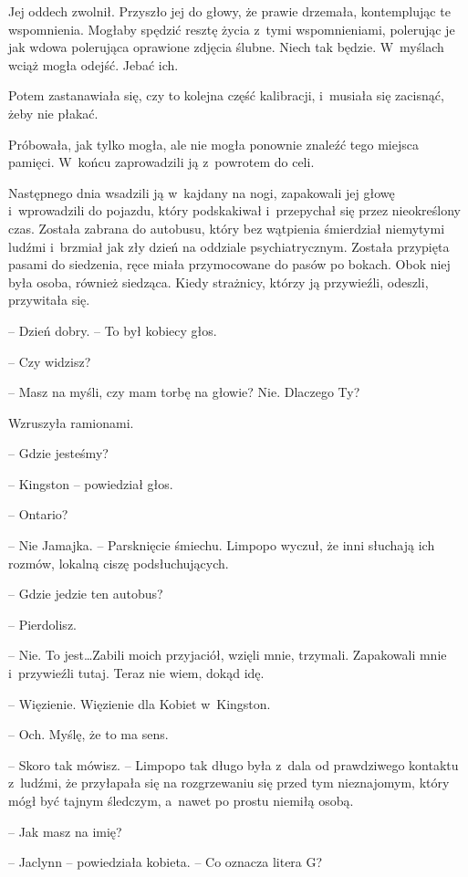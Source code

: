 \documentclass[oneside,polish,11pt,sfheadings]{mwbk}
\begin{document}
Jej oddech zwolnił. Przyszło jej do głowy, że prawie drzemała,
kontemplując te wspomnienia. Mogłaby spędzić resztę życia z~tymi
wspomnieniami, polerując je jak wdowa polerująca oprawione zdjęcia
ślubne. Niech tak będzie. W~myślach wciąż mogła odejść. Jebać ich.

Potem zastanawiała się, czy to kolejna część kalibracji, i~musiała się
zacisnąć, żeby nie płakać.

Próbowała, jak tylko mogła, ale nie mogła ponownie znaleźć tego miejsca
pamięci. W~końcu zaprowadzili ją z~powrotem do celi.

Następnego dnia wsadzili ją w~kajdany na nogi, zapakowali jej głowę i~wprowadzili do pojazdu, który podskakiwał i~przepychał się przez
nieokreślony czas. Została zabrana do autobusu, który bez wątpienia
śmierdział niemytymi ludźmi i~brzmiał jak zły dzień na oddziale
psychiatrycznym. Została przypięta pasami do siedzenia, ręce miała
przymocowane do pasów po bokach. Obok niej była osoba, również siedząca.
Kiedy strażnicy, którzy ją przywieźli, odeszli, przywitała się.

-- Dzień dobry. -- To był kobiecy głos.

-- Czy widzisz?

-- Masz na myśli, czy mam torbę na głowie? Nie. Dlaczego Ty?

Wzruszyła ramionami.

-- Gdzie jesteśmy?

-- Kingston -- powiedział głos.

-- Ontario?

-- Nie Jamajka. -- Parsknięcie śmiechu. Limpopo wyczuł, że inni słuchają
ich rozmów, lokalną ciszę podsłuchujących.

-- Gdzie jedzie ten autobus?

-- Pierdolisz.

-- Nie. To jest\ldots  Zabili moich przyjaciół, wzięli mnie, trzymali.
Zapakowali mnie i~przywieźli tutaj. Teraz nie wiem, dokąd idę.

-- Więzienie. Więzienie dla Kobiet w~Kingston.

-- Och. Myślę, że to ma sens.

-- Skoro tak mówisz. -- Limpopo tak długo była z~dala od prawdziwego
kontaktu z~ludźmi, że przyłapała się na rozgrzewaniu się przed tym
nieznajomym, który mógł być tajnym śledczym, a~nawet po prostu niemiłą
osobą.

-- Jak masz na imię?

-- Jaclynn -- powiedziała kobieta. -- Co oznacza litera G?
\end{document}
